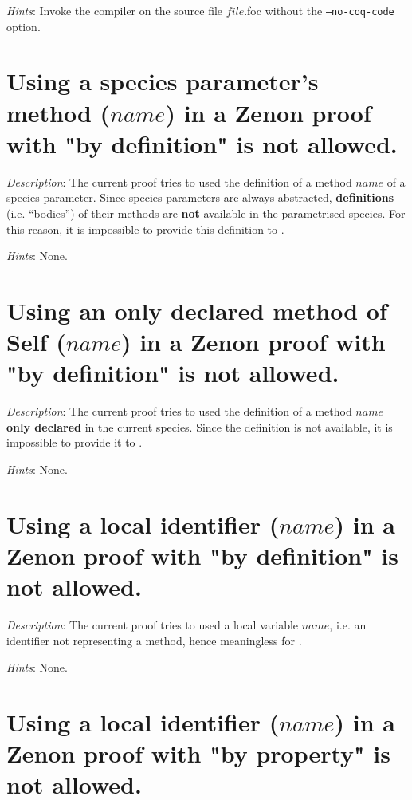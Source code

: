 {\em Hints}: Invoke the compiler on the source file $file$.foc without
the {\tt --no-coq-code} option.



\section*{Using a species parameter's method ($name$) in a Zenon proof
  with "by definition" is not allowed.}

{\em Description}: The current proof tries to used the definition of a
method $name$ of a species parameter. Since species parameters are
always abstracted, {\bf definitions} (i.e. ``bodies'') of their methods
are {\bf not} available in the parametrised species. For this reason,
it is impossible to provide this definition to \zenon.

{\em Hints}: None.



\section*{Using an only declared method of Self ($name$) in a Zenon
  proof with "by definition" is not allowed.}

{\em Description}: The current proof tries to used the definition of a
method $name$ {\bf only declared} in the current species. Since the
definition is not available, it is impossible to provide it to
\zenon.

{\em Hints}: None.



\section*{Using a local identifier ($name$) in a Zenon proof with "by
  definition" is not allowed.}

{\em Description}: The current proof tries to used a local variable
$name$, i.e. an identifier not representing a method, hence
meaningless for \zenon.

{\em Hints}: None.



\section*{Using a local identifier ($name$) in a Zenon proof with "by
  property" is not allowed.}

